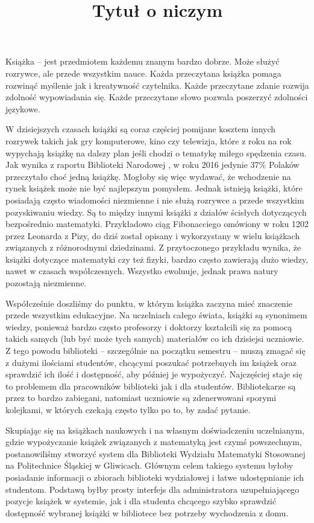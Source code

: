 \documentclass[twoside]{projektInzynierskiMS}
\title{Tytuł o niczym}
\begin{document}
Książka -- jest przedmiotem każdemu znanym bardzo dobrze. Może służyć rozrywce, ale przede wszystkim nauce. Każda przeczytana książka pomaga rozwinąć myślenie jak i kreatywność czytelnika. Każde przeczytane zdanie rozwija zdolność wypowiadania się. 
Każde przeczytane słowo pozwala poszerzyć zdolności językowe.


W dzisiejszych czasach książki są coraz częściej pomijane kosztem innych rozrywek takich jak gry komputerowe, kino czy telewizja, które z roku na rok wypychają książkę na dalszy plan jeśli chodzi o tematykę miłego spędzenia czasu. Jak wynika z raportu Biblioteki Narodowej \cite{raportBN}, w roku 2016 jedynie 37\% Polaków przeczytało choć jedną książkę. Mogłoby się więc wydawać, że wchodzenie na rynek książek może nie być najlepszym pomysłem. Jednak istnieją książki, które posiadają często wiadomości niezmienne i nie służą rozrywce a przede wszystkim pozyskiwaniu wiedzy. Są to między innymi książki z działów ścisłych dotyczących bezpośrednio matematyki. Przykładowo ciąg Fibonacciego omówiony w roku 1202 przez Leonarda z Pizy, do dziś został opisany i wykorzystany w wielu książkach związanych z różnorodnymi dziedzinami. Z przytoczonego przykładu wynika, że książki dotyczące matematyki czy też fizyki, bardzo często zawierają dużo wiedzy, nawet w czasach współczesnych. Wszystko ewoluuje, jednak prawa natury pozostają niezmienne.

Współcześnie doszliśmy do punktu, w którym książka zaczyna mieć znaczenie przede wszystkim edukacyjne. Na uczelniach całego świata, książki są synonimem wiedzy, ponieważ bardzo często profesorzy i doktorzy kształcili się za pomocą takich samych (lub być może tych samych) materiałów co ich dzisiejsi uczniowie. Z tego powodu biblioteki -- szczególnie na początku semestru -- muszą zmagać się z dużymi ilościami studentów, chcącymi poszukać potrzebnych im książek oraz sprawdzić ich ilość i dostępność, aby później je wypożyczyć. Najczęściej staje się to problemem dla pracowników biblioteki jak i dla studentów. Bibliotekarze są przez to bardzo zabiegani, natomiast uczniowie są zdenerwowani sporymi kolejkami, w których czekają często tylko po to, by zadać pytanie.

Skupiając się na książkach naukowych i na własnym doświadczeniu uczelnianym, gdzie wypożyczanie książek związanych z matematyką jest czymś powszechnym, postanowiliśmy stworzyć system dla Biblioteki Wydziału Matematyki Stosowanej na Politechnice Śląskiej w Gliwicach. Głównym celem takiego systemu byłoby posiadanie informacji o zbiorach biblioteki wydziałowej i łatwe udostępnianie ich studentom. Podstawą byłby prosty interfejs dla administratora uzupełniającego pozycje książek w systemie, jak i dla studenta chcącego szybko sprawdzić dostępność wybranej książki w bibliotece bez potrzeby wychodzenia z domu.
\end{document}
